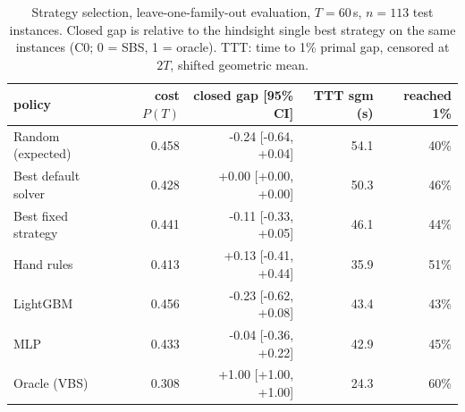 \begin{table}[t]\centering\small
\begin{tabular}{lrrrr}
\toprule
policy & cost $P(T)$ & closed gap [95\% CI] & TTT sgm (s) & reached 1\% \\
\midrule
Random (expected) & 0.458 & -0.24 [-0.64, +0.04] & 54.1 & 40\% \\
Best default solver & 0.428 & +0.00 [+0.00, +0.00] & 50.3 & 46\% \\
Best fixed strategy & 0.441 & -0.11 [-0.33, +0.05] & 46.1 & 44\% \\
Hand rules & 0.413 & +0.13 [-0.41, +0.44] & 35.9 & 51\% \\
LightGBM & 0.456 & -0.23 [-0.62, +0.08] & 43.4 & 43\% \\
MLP & 0.433 & -0.04 [-0.36, +0.22] & 42.9 & 45\% \\
Oracle (VBS) & 0.308 & +1.00 [+1.00, +1.00] & 24.3 & 60\% \\
\bottomrule
\end{tabular}
\caption{Strategy selection, leave-one-family-out evaluation, $T=60$\,s, $n=113$ test instances. Closed gap is relative to the hindsight single best strategy on the same instances (C0; 0 = SBS, 1 = oracle). TTT: time to 1\% primal gap, censored at $2T$, shifted geometric mean.}\label{tab:sel-lofo-60}
\end{table}
